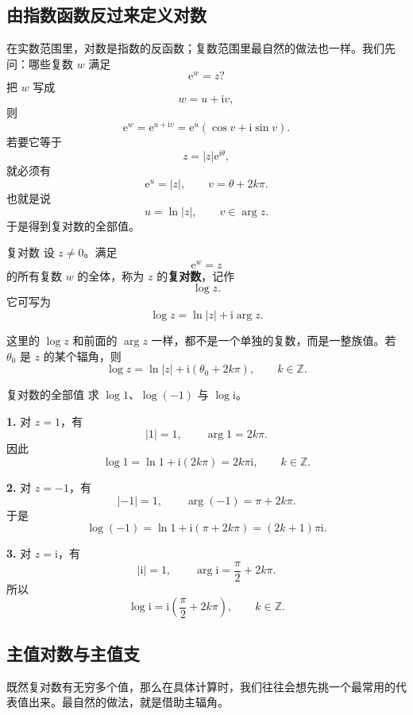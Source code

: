 \subsection{由指数函数反过来定义对数}

在实数范围里，对数是指数的反函数；复数范围里最自然的做法也一样。我们先问：哪些复数 $w$ 满足
\[
    \mathrm{e}^{w}=z?
\]
把 $w$ 写成
\[
    w=u+\mathrm{i}v,
\]
则
\[
    \mathrm{e}^{w}=\mathrm{e}^{u+\mathrm{i}v}
    =\mathrm{e}^{u}(\cos v+\mathrm{i}\sin v).
\]
若要它等于
\[
    z=|z|\mathrm{e}^{\mathrm{i}\theta},
\]
就必须有
\[
    \mathrm{e}^{u}=|z|,\qquad v=\theta+2k\pi.
\]
也就是说
\[
    u=\ln|z|,\qquad v\in \arg z.
\]
于是得到复对数的全部值。

\begin{dingliyi}{复对数}{}
设 $z\neq 0$。满足
\[
    \mathrm{e}^{w}=z
\]
的所有复数 $w$ 的全体，称为 $z$ 的\textbf{复对数}，记作
\[
    \log z.
\]
它可写为
\[
    \log z=\ln|z|+\mathrm{i}\arg z.
\]
\end{dingliyi}

\begin{zhu}{}{}
这里的 $\log z$ 和前面的 $\arg z$ 一样，都不是一个单独的复数，而是一整族值。若 $\theta_0$ 是 $z$ 的某个辐角，则
\[
    \log z=\ln|z|+\mathrm{i}(\theta_0+2k\pi),\qquad k\in\mathbb{Z}.
\]
\end{zhu}

\begin{lizi}{复对数的全部值}{}
求 $\log 1$、$\log(-1)$ 与 $\log \mathrm{i}$。

\begin{jie}
\textbf{1.} 对 $z=1$，有
\[
    |1|=1,\qquad \arg 1=2k\pi.
\]
因此
\[
    \log 1=\ln 1+\mathrm{i}(2k\pi)=2k\pi \mathrm{i},\qquad k\in\mathbb{Z}.
\]

\textbf{2.} 对 $z=-1$，有
\[
    |-1|=1,\qquad \arg(-1)=\pi+2k\pi.
\]
于是
\[
    \log(-1)=\ln 1+\mathrm{i}(\pi+2k\pi)=(2k+1)\pi\mathrm{i}.
\]

\textbf{3.} 对 $z=\mathrm{i}$，有
\[
    |\mathrm{i}|=1,\qquad \arg \mathrm{i}=\frac{\pi}{2}+2k\pi.
\]
所以
\[
    \log \mathrm{i}
    =\mathrm{i}\left(\frac{\pi}{2}+2k\pi\right),\qquad k\in\mathbb{Z}.
\]
\end{jie}
\end{lizi}

\subsection{主值对数与主值支}

既然复对数有无穷多个值，那么在具体计算时，我们往往会想先挑一个最常用的代表值出来。最自然的做法，就是借助主辐角。

